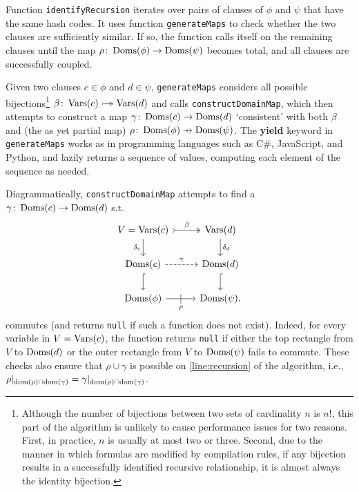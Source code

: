 Function \texttt{identifyRecursion} iterates over pairs of clauses of $\phi$ and $\psi$ that have the same hash codes. It uses function \texttt{generateMaps} to check whether the two clauses are sufficiently similar. If so, the function calls itself on the remaining clauses until the map $\rho\colon \operatorname{Doms}(\phi) \to \operatorname{Doms}(\psi)$ becomes total, and all clauses are successfully coupled.


Given two clauses $c \in \phi$ and $d \in \psi$, \texttt{generateMaps} considers all possible bijections\footnote{Although the number of bijections between two sets of cardinality $n$ is $n!$, this part of the algorithm is unlikely to cause performance issues for two reasons. First, in practice, $n$ is usually at most two or three. Second, due to the manner in which formulas are modified by compilation rules, if any bijection results in a successfully identified recursive relationship, it is almost always the identity bijection.} $\beta\colon \operatorname{Vars}(c) \mathrel{\rightarrowtail\kern-1.9ex\twoheadrightarrow} \operatorname{Vars}(d)$ and calls \texttt{constructDomainMap}, which then attempts to construct a map $\gamma\colon \operatorname{Doms}(c) \to \operatorname{Doms}(d)$ `consistent' with both $\beta$ and (the as yet partial map) $\rho\colon \Doms(\phi) \pfun \Doms(\psi)$. The \textbf{yield} keyword in \texttt{generateMaps} works as in programming languages such as C\#, JavaScript, and Python, and lazily returns a sequence of values, computing each element of the sequence as needed.

Diagrammatically, \texttt{constructDomainMap} attempts to find a $\gamma\colon \operatorname{Doms}(c) \to \operatorname{Doms}(d)$ s.t.
\begin{equation} \label{eq:commute}
\begin{tikzcd}
  V = \Vars(c) \ar[r, tail, two heads, "\beta"] \arrow[d, swap, "\delta_c"] & \Vars(d) \ar[d, "\delta_d"] \\
  \Doms(c) \ar[r, dashed, "\gamma"] \ar[d, hookrightarrow] & \Doms(d) \ar[d, hookrightarrow] \\
  \Doms(\phi) \ar[r, swap, "\rho", "|" marking, outer sep=5pt] & \Doms(\psi).
\end{tikzcd}
\end{equation}
commutes (and returns \texttt{null} if such a function does not exist). Indeed, for every variable in $V = \operatorname{Vars}(c)$, the function returns \texttt{null} if either the top rectangle from $V$ to $\operatorname{Doms}(d)$ or the outer rectangle from $V$ to $\operatorname{Doms}(\psi)$ fails to commute. These checks also ensure that $\rho \cup \gamma$ is possible on \cref{line:recursion} of the algorithm, i.e., $\rho|_{\operatorname{dom}(\rho)\cap\operatorname{dom}(\gamma)} = \gamma|_{\operatorname{dom}(\rho)\cap\operatorname{dom}(\gamma)}$.

